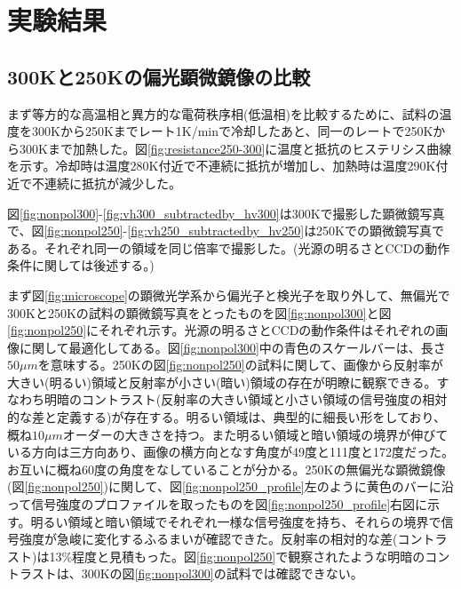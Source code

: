\documentclass[11pt,a4paper]{jsarticle}
\begin{document}
\section{実験結果}
\subsection{300Kと250Kの偏光顕微鏡像の比較}
まず等方的な高温相と異方的な電荷秩序相(低温相)を比較するために、試料の温度を300Kから250Kまでレート1K/minで冷却したあと、同一のレートで250Kから300Kまで加熱した。図\ref{fig:resistance250-300}に温度と抵抗のヒステリシス曲線を示す。冷却時は温度280K付近で不連続に抵抗が増加し、加熱時は温度290K付近で不連続に抵抗が減少した。

図\ref{fig:nonpol300}-\ref{fig:vh300_subtractedby_hv300}は300Kで撮影した顕微鏡写真で、図\ref{fig:nonpol250}-\ref{fig:vh250_subtractedby_hv250}は250Kでの顕微鏡写真である。それぞれ同一の領域を同じ倍率で撮影した。(光源の明るさとCCDの動作条件に関しては後述する。)

まず図\ref{fig:microscope}の顕微光学系から偏光子と検光子を取り外して、無偏光で300Kと250Kの試料の顕微鏡写真をとったものを図\ref{fig:nonpol300}と図\ref{fig:nonpol250}にそれぞれ示す。光源の明るさとCCDの動作条件はそれぞれの画像に関して最適化してある。図\ref{fig:nonpol300}中の青色のスケールバーは、長さ$50 \mu m$を意味する。250Kの図\ref{fig:nonpol250}の試料に関して、画像から反射率が大きい(明るい)領域と反射率が小さい(暗い)領域の存在が明瞭に観察できる。すなわち明暗のコントラスト(反射率の大きい領域と小さい領域の信号強度の相対的な差と定義する)が存在する。明るい領域は、典型的に細長い形をしており、概ね$10 \mu m$オーダーの大きさを持つ。また明るい領域と暗い領域の境界が伸びている方向は三方向あり、画像の横方向となす角度が49度と111度と172度だった。お互いに概ね60度の角度をなしていることが分かる。250Kの無偏光な顕微鏡像(図\ref{fig:nonpol250})に関して、図\ref{fig:nonpol250_profile}左のように黄色のバーに沿って信号強度のプロファイルを取ったものを図\ref{fig:nonpol250_profile}右図に示す。明るい領域と暗い領域でそれぞれ一様な信号強度を持ち、それらの境界で信号強度が急峻に変化するふるまいが確認できた。反射率の相対的な差(コントラスト)は13\%程度と見積もった。図\ref{fig:nonpol250}で観察されたような明暗のコントラストは、300Kの図\ref{fig:nonpol300}の試料では確認できない。
\end{document}
